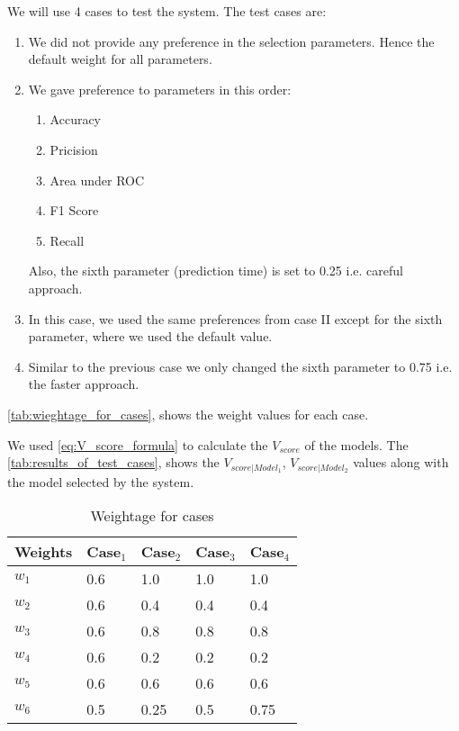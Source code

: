 We will use 4 cases to test the system. The test cases are:
\begin{enumerate}[{Case} I:]
    \item We did not provide any preference in the selection parameters. Hence the default weight for all parameters.
    \item We gave preference to parameters in this order:
          \begin{enumerate}[1.]
              \item Accuracy
              \item Pricision
              \item Area under ROC
              \item F1 Score
              \item Recall
          \end{enumerate}
          Also, the sixth parameter (prediction time) is set to 0.25 i.e. careful approach.
    \item In this case, we used the same preferences from case II except for the sixth parameter, where we used the default value.
    \item Similar to the previous case we only changed the sixth parameter to 0.75 i.e. the faster approach.
\end{enumerate}
\autoref{tab:wieghtage_for_cases}, shows the weight values for each case.

We used \autoref{eq:V_score_formula} to calculate the $V_{score}$ of the models. The \autoref{tab:results_of_test_cases}, shows the $V_{score|Model_1}$, $V_{score|Model_2}$ values along with the model selected by the system.

\begin{table}[!hb]
    \caption{Weightage for cases}\label{tab:wieghtage_for_cases}
    \begin{tabular*}{\tblwidth}{@{}LLLLL@{}}
        \toprule
        Weights & Case$_1$ & Case$_2$ & Case$_3$ & Case$_4$ \\
        \midrule
        $w_1$ & 0.6 & 1.0 & 1.0 & 1.0 \\
        $w_2$ & 0.6 & 0.4 & 0.4 & 0.4 \\
        $w_3$ & 0.6 & 0.8 & 0.8 & 0.8 \\
        $w_4$ & 0.6 & 0.2 & 0.2 & 0.2 \\
        $w_5$ & 0.6 & 0.6 & 0.6 & 0.6 \\
        $w_6$ & 0.5 & 0.25 & 0.5 & 0.75 \\
        \bottomrule
    \end{tabular*}
\end{table}


